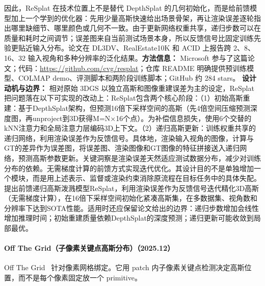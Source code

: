 因此，ReSplat 在技术位置上不是替代 DepthSplat 的几何初始化，而是给前馈模型加上一个学到的优化器：先用少量高斯快速给出场景骨架，再让渲染误差逐轮指出哪里缺细节、哪里颜色或几何不一致。由于更新网络权重共享，递归步数可以在质量和耗时之间调节；误差图来自当前测试场景本身，所以反馈信号比固定训练先验更贴近输入分布。论文在 DL3DV、RealEstate10K 和 ACID 上报告跨 2、8、16、32 输入视角和多种分辨率的泛化结果。\textbf{方法信息：} Microsoft 参与了这篇论文；代码：\url{https://github.com/cvg/resplat}；仓库 README 明确提供预训练模型、COLMAP demo、评测脚本和两阶段训练脚本；GitHub 约 284 stars。
\textbf{设计动机与边界：} 相对原始 3DGS 以独立高斯和图像重建误差为主的设定，ReSplat 把问题落在以下可实现的改动上：ReSplat包含两个核心阶段：（1）初始高斯重建：基于DepthSplat架构，但预测16倍下采样空间的高斯（先4倍空间压缩预测深度图，再unproject到3D获得M=N×16个点）。为补偿信息损失，使用6个交替的kNN注意力和全局注意力层编码3D上下文。（2）递归高斯更新：训练权重共享的递归网络，利用渲染误差作为反馈信号。具体地，渲染输入视角的图像，计算与GT的差异作为误差图，将误差图、渲染图像和GT图像的特征拼接送入递归网络，预测高斯参数更新。关键洞察是渲染误差天然适应测试数据分布，减少对训练分布的依赖。无需梯度计算的前馈方式实现迭代优化。其设计目的不是单独增加一个模块，而是用上述表示、监督或渲染约束消除原流程在目标任务中的具体失配。提出前馈递归高斯泼溅模型ReSplat，利用渲染误差作为反馈信号迭代精化3D高斯（无需梯度计算），在16倍下采样空间初始化紧凑高斯集，在多数据集、视角数和分辨率下达到SOTA性能。适用时还应保留论文给出的边界：递归步数增加会线性增加推理时间；初始重建质量依赖DepthSplat的深度预测；递归更新可能收敛到局部最优。
\paragraph{Off The Grid（子像素关键点高斯分布）（2025.12）}
Off The Grid~\cite{2512_15508} 针对像素网格绑定。它用 patch 内子像素关键点检测决定高斯位置，而不是每个像素固定放一个 primitive。

